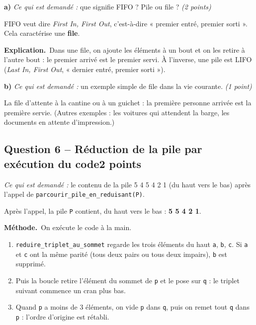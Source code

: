 \documentclass[11pt, a4paper]{exam}
\newcommand{\code}[1]{\texttt{#1}}
\newcommand{\Qt}[2]{\subsection*{#1\hfill{\normalfont\small #2}}}
\newcommand{\rappel}[1]{\noindent\textit{Ce qui est demandé :} #1\par\smallskip}
\newcommand{\methode}{\noindent\textbf{Méthode.}\ }
\newcommand{\explication}{\noindent\textbf{Explication.}\ }
\begin{document}
\textbf{a)} \rappel{que signifie FIFO ? Pile ou file ? \hfill\textit{(2 points)}}
\begin{reponse}
FIFO veut dire \textit{First In, First Out}, c'est-à-dire « premier entré, premier sorti ». Cela caractérise une \textbf{file}.
\end{reponse}
\explication Dans une file, on ajoute les éléments à un bout et on les retire à l'autre bout : le premier arrivé est le premier servi. À l'inverse, une pile est LIFO (\textit{Last In, First Out}, « dernier entré, premier sorti »).

\textbf{b)} \rappel{un exemple simple de file dans la vie courante. \hfill\textit{(1 point)}}
\begin{reponse}
La file d'attente à la cantine ou à un guichet : la première personne arrivée est la première servie. (Autres exemples : les voitures qui attendent la barge, les documents en attente d'impression.)
\end{reponse}

\Qt{Question 6 -- Réduction de la pile par exécution du code}{2 points}
\rappel{le contenu de la pile 5 4 5 4 2 1 (du haut vers le bas) après l'appel de \code{parcourir\_\allowbreak pile\_\allowbreak en\_\allowbreak reduisant(P)}.}
\begin{reponse}
Après l'appel, la pile \code{P} contient, du haut vers le bas : \textbf{5 5 4 2 1}.
\end{reponse}

\methode On exécute le code à la main.
\begin{enumerate}
\item \code{reduire\_triplet\_au\_sommet} regarde les trois éléments du haut \code{a}, \code{b}, \code{c}. Si \code{a} et \code{c} ont la même parité (tous deux pairs ou tous deux impairs), \code{b} est supprimé.
\item Puis la boucle retire l'élément du sommet de \code{p} et le pose sur \code{q} : le triplet suivant commence un cran plus bas.
\item Quand \code{p} a moins de 3 éléments, on vide \code{p} dans \code{q}, puis on remet tout \code{q} dans \code{p} : l'ordre d'origine est rétabli.
\end{enumerate}
\end{document}
